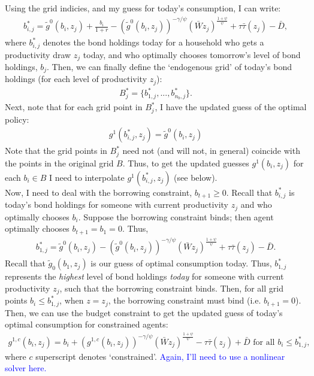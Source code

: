 \documentclass[12pt]{article}
\begin{document}
Using the grid indicies, and my guess for today's consumption, I can write:
\begin{align*}
b^*_{i,j} = \tilde g^0(b_i,z_j) + \frac{b_i}{1+r} - \left(\tilde g^0(b_i,z_j)\right)^{-\gamma/\psi} (\bar Wz_j)^{\frac{1+\psi}{\psi}} + \tau\bar\tau(z_j) - \bar D ,
\end{align*}
where $b^*_{i,j}$ denotes the bond holdings today for a household who gets a productivity draw $z_j$ today, and who optimally chooses tomorrow's level of bond holdings, $b_j$. Then, we can finally define the `endogenous grid' of today's bond holdings (for each level of productivity $z_j$):
\begin{align*}
B_j^* = \{ b^*_{1,j}, ... , b^*_{n_b,j}\}.
\end{align*}
Next, note that for each grid point in $B_j^*$, I have the updated guess of the optimal policy:
\begin{align*}
g^1(b^*_{i,j},z_j) =  \tilde g^0(b_i,z_j)
\end{align*}
Note that the grid points in $B_j^*$ need not (and will not, in general) coincide with the points in the original grid $B$. Thus, to get the updated guesses $g^1(b_i,z_j)$ for each $b_i \in B$ I need to interpolate $g^1(b^*_{i,j},z_j)$ (see below).\\

Now, I need to deal with the borrowing constraint, $b_{t+1} \geq 0$. Recall that $b^*_{i,j}$ is today's bond holdings for someone with current productivity $z_j$ and who optimally chooses $b_i$. Suppose the borrowing constraint binds;  then agent optimally chooses $b_{t+1} = b_1 =0$. Thus,
\begin{align*}
b^*_{1,j} = \tilde g^0(b_i,z_j) - \left(\tilde g^0(b_i,z_j)\right)^{-\gamma/\psi} (\bar Wz_j)^{\frac{1+\psi}{\psi}} + \tau\bar\tau(z_j) - \bar D.
\end{align*}
Recall that $\tilde g_0(b_1,z_j)$ is our guess of optimal consumption today. Thus, $b^*_{1,j}$ represents the \textit{highest} level of bond holdings \textit{today} for someone with current productivity $z_j$, such that the borrowing constraint binds. Then, for all grid points $b_i \leq b^*_{1,j}$, when $z=z_j$, the borrowing constraint must bind (i.e. $b_{t+1}=0$). Then, we can use the budget constraint to get the updated guess of today's optimal consumption for constrained agents:
\begin{align*}
g^{1,c}(b_i,z_j) = b_i + \left(g^{1,c}(b_i,z_j)\right)^{-\gamma/\psi} (\bar Wz_j)^{\frac{1+\psi}{\psi}} - \tau\bar\tau(z_j) +\bar D \text{ for all } b_i \leq b^*_{1,j},
\end{align*}
where $c$ superscript denotes `constrained'. \textcolor{blue}{Again, I'll need to use a nonlinear solver here.}\\
\end{document}

